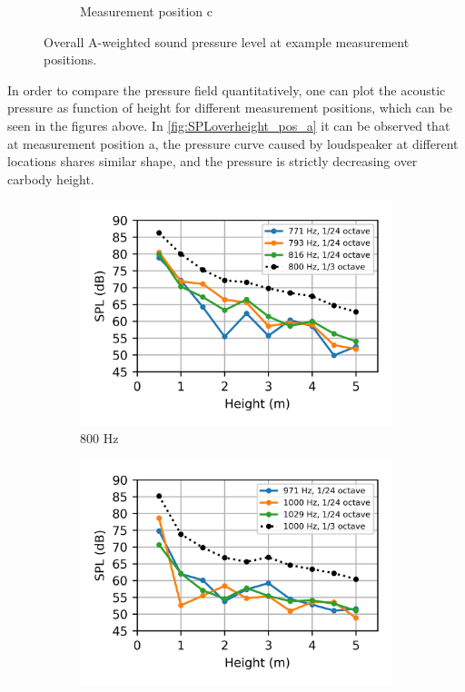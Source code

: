 \begin{figure}[H]
\begin{subfigure}[b]{0.48\textwidth}
        \caption{Measurement position c}
    \end{subfigure}
    \caption{Overall A-weighted sound pressure level at example measurement positions.}
    \label{fig:SPLoverheight}
\end{figure}

\noindent In order to compare the pressure field quantitatively, one can plot the acoustic pressure as function of height for different measurement positions, which can be seen in the figures above. In \ref{fig:SPLoverheight_pos_a} it can be observed that at measurement position a, the pressure curve caused by loudspeaker at different locations shares similar shape, and the pressure is strictly decreasing over carbody height.

\begin{figure}[H]
    \centering
     \begin{subfigure}[b]{0.48\textwidth}
        \centering
        \includegraphics{fig/pressure_over_height_800Hz.png}
        \caption{800 Hz}
        \label{fig:SPLoverheight_frequency_800Hz}
    \end{subfigure}
    \begin{subfigure}[b]{0.48\textwidth}
        \centering
        \includegraphics{fig/pressure_over_height_1000Hz.png}

\end{subfigure}
\end{figure}
